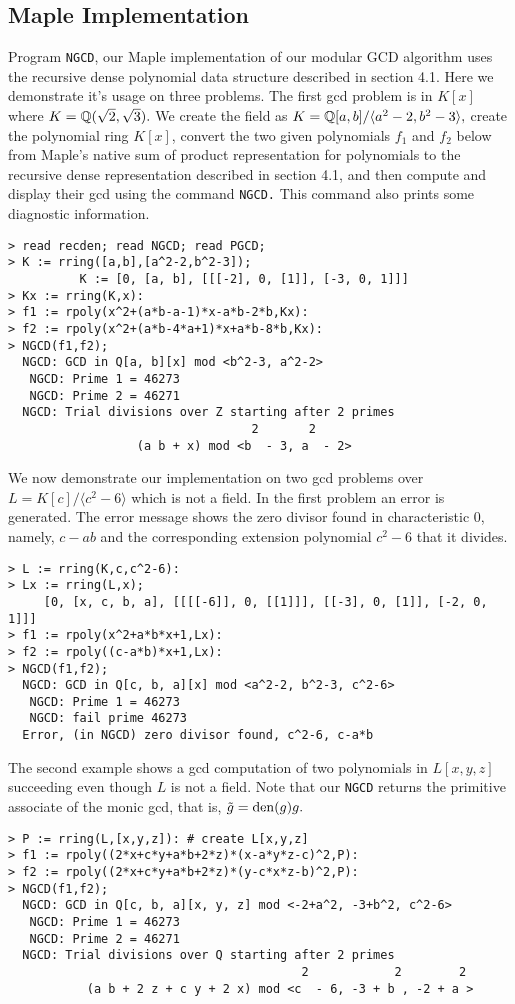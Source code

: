 \documentclass[10pt]{article}
\begin{document}
 

\subsection{Maple Implementation}
Program {\tt NGCD}, our Maple implementation of our modular GCD
algorithm uses the recursive dense polynomial data structure
described in section 4.1. Here we demonstrate it's usage on three
problems. The first gcd problem is in $K[x]$ where $K={\mathbb Q}(\sqrt 2,
\sqrt 3).$  We create the field as $K = {\mathbb Q}[a,b]/\langle a^2-2,b^2-3
\rangle,$ create the polynomial ring $K[x]$, convert the two given
polynomials $f_1$ and $f_2$ below from Maple's native sum of product
representation for polynomials to the recursive dense representation
described in section 4.1, and then compute and display their gcd
using the command {\tt NGCD.}  This command also prints some
diagnostic information.
{ \small
\begin{verbatim}
> read recden; read NGCD; read PGCD;
> K := rring([a,b],[a^2-2,b^2-3]);
          K := [0, [a, b], [[[-2], 0, [1]], [-3, 0, 1]]]
> Kx := rring(K,x):
> f1 := rpoly(x^2+(a*b-a-1)*x-a*b-2*b,Kx):
> f2 := rpoly(x^2+(a*b-4*a+1)*x+a*b-8*b,Kx):
> NGCD(f1,f2);
  NGCD: GCD in Q[a, b][x] mod <b^2-3, a^2-2>
   NGCD: Prime 1 = 46273
   NGCD: Prime 2 = 46271
  NGCD: Trial divisions over Z starting after 2 primes
                                  2       2
                  (a b + x) mod <b  - 3, a  - 2>
\end{verbatim}
}

\noindent We now demonstrate our implementation on two gcd problems
over $L = K[c]/\langle c^2-6 \rangle$ which is not a field. In the
first problem an error is generated. The error message shows the
zero divisor found in characteristic 0, namely, $c-ab$ and the
corresponding extension polynomial $c^2-6$ that it divides.


{ \small
\begin{verbatim}
> L := rring(K,c,c^2-6):
> Lx := rring(L,x);
     [0, [x, c, b, a], [[[[-6]], 0, [[1]]], [[-3], 0, [1]], [-2, 0, 1]]]
> f1 := rpoly(x^2+a*b*x+1,Lx):
> f2 := rpoly((c-a*b)*x+1,Lx):
> NGCD(f1,f2);
  NGCD: GCD in Q[c, b, a][x] mod <a^2-2, b^2-3, c^2-6>
   NGCD: Prime 1 = 46273
   NGCD: fail prime 46273
  Error, (in NGCD) zero divisor found, c^2-6, c-a*b
\end{verbatim}
}

\noindent The second example shows a gcd computation of two
polynomials in $L[x,y,z]$ succeeding even though $L$ is not a field.
Note that our {\tt NGCD} returns the primitive associate of the
monic gcd, that is, $\tilde{g} = {\rm den}(g) g.$
{ \small
\begin{verbatim}
> P := rring(L,[x,y,z]): # create L[x,y,z]
> f1 := rpoly((2*x+c*y+a*b+2*z)*(x-a*y*z-c)^2,P):
> f2 := rpoly((2*x+c*y+a*b+2*z)*(y-c*x*z-b)^2,P):
> NGCD(f1,f2);
  NGCD: GCD in Q[c, b, a][x, y, z] mod <-2+a^2, -3+b^2, c^2-6>
   NGCD: Prime 1 = 46273
   NGCD: Prime 2 = 46271
  NGCD: Trial divisions over Q starting after 2 primes
                                         2            2        2
           (a b + 2 z + c y + 2 x) mod <c  - 6, -3 + b , -2 + a >
\end{verbatim}
}
\end{document}
